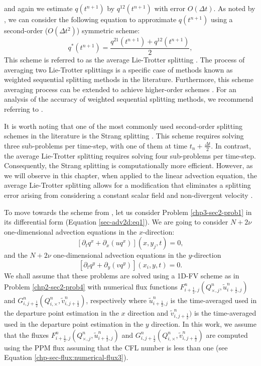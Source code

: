 and again we estimate $q(t^{n+1})$ by $q^{12}(t^{n+1})$ with error $O(\Delta t)$.
As noted by \citet{strang:1968}, we can consider the following equation 
to approximate $q(t^{n+1})$ using a second-order ($O(\Delta t^2)$) symmetric scheme:
\begin{equation}
	q^*(t^{n+1}) = \frac{q^{21}(t^{n+1}) + q^{12}(t^{n+1})}{2},
\end{equation}
This scheme is referred to as the average Lie-Trotter splitting \citep{holden:2010}.
The process of averaging two Lie-Trotter splittings is a specific case of methods
known as weighted sequential splitting methods in the literature.
Furthermore, this scheme averaging process can be extended to achieve higher-order schemes \citep{jia:2011}.
For an analysis of the accuracy of weighted sequential splitting methods, we recommend referring to \citet{csomos:2005}.

It is worth noting that one of the most commonly used second-order splitting schemes in the literature is the Strang splitting
\citep{strang:1968}.
This scheme requires solving three sub-problems per time-step, with one of them at time $t_n + \frac{\Delta t}{2}$.
In contrast, the average Lie-Trotter splitting requires solving four sub-problems per time-step.
Consequently, the Strang splitting is computationally more efficient.
However, as we will observe in this chapter, when applied to the linear advection equation, 
the average Lie-Trotter splitting allows for a modification that eliminates a splitting error
arising from considering a constant scalar field and non-divergent velocity \citep{lin:1996}.

To move towards the scheme from \citet{lin:1996}, let us consider Problem \ref{chp3-sec2-prob1} in its differential form (Equation \eqref{sec-adv2d:eq1}).
We are going to consider $N+2\nu$ one-dimensional advection equations in the $x$-direction:
\begin{equation*}
	\label{chp3-adv2deq-xdir1}
	[{\partial_t q^x}+{\partial_x (uq^x)}](x, y_j, t)
	= 0,
\end{equation*}
and the $N+2\nu$ one-dimensional advection equations in the $y$-direction
\begin{equation*}
	\label{chp3-adv2deq-ydir1}
	[{\partial_t q^y} +{\partial_y (vq^y)}](x_i, y, t) = 0.   
\end{equation*}
We shall assume that these problems are solved using a 1D-FV scheme as in Problem \ref{chp2-sec2-prob4}
with numerical flux functions ${F}_{i+\frac{1}{2},j}^n(Q^n_{\times,j},\tilde{u}^n_{i+\frac{1}{2},j})$ and
${G}^n_{i,j+\frac{1}{2}}(Q^n_{i,\times},\tilde{v}^n_{i,j+\frac{1}{2}})$, respectively
where $\tilde{u}^n_{i+\frac{1}{2},j}$ is the time-averaged used in the departure point estimation in the $x$ direction
and $\tilde{v}^n_{i,j+\frac{1}{2}})$ is the time-averaged used in the departure point estimation in the $y$ direction.
In this work, we assume that the fluxes ${F}_{i+\frac{1}{2},j}^n(Q^n_{\times,j},\tilde{u}^n_{i+\frac{1}{2},j})$ and
${G}^n_{i,j+\frac{1}{2}}(Q^n_{i,\times} ,\tilde{v}^n_{i,j+\frac{1}{2}})$ are computed using the PPM flux
assuming that the CFL number is less than one (see Equation \eqref{chp-sec-flux:numerical-flux3}).

